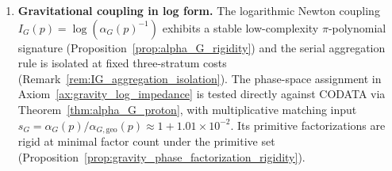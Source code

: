 \begin{enumerate}
    \item \textbf{Gravitational coupling in log form.} The logarithmic Newton coupling $I_G(p)=\log(\alpha_G(p)^{-1})$ exhibits a stable low-complexity $\pi$-polynomial signature (Proposition~\ref{prop:alpha_G_rigidity}) and the serial aggregation rule is isolated at fixed three-stratum costs (Remark~\ref{rem:IG_aggregation_isolation}). The phase-space assignment in Axiom~\ref{ax:gravity_log_impedance} is tested directly against CODATA via Theorem~\ref{thm:alpha_G_proton}, with multiplicative matching input $s_G=\alpha_G(p)/\alpha_{G,\mathrm{geo}}(p)\approx 1+1.01\times 10^{-2}$. Its primitive factorizations are rigid at minimal factor count under the primitive set (Proposition~\ref{prop:gravity_phase_factorization_rigidity}).
\end{enumerate}
